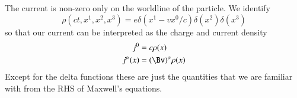 %
The current is non-zero only on the worldline of the particle.  We identify
%
\begin{equation}\label{eqn:relativisticElectrodynamicsL12b:550}
\rho(ct, x^1, x^2, x^3) = e \delta(x^1 - v x^0/c) \delta(x^2) \delta(x^3)
\end{equation}
%
so that our current can be interpreted as the charge and current density
%
\begin{equation}\label{eqn:relativisticElectrodynamicsL12b:570}
\begin{aligned}
j^0 &= c \rho(x) \\
j^\alpha(x) &= (\Bv)^\alpha \rho(x)
\end{aligned}
\end{equation}
%
Except for the delta functions these are just the quantities that we are familiar with from the RHS of Maxwell's equations.
